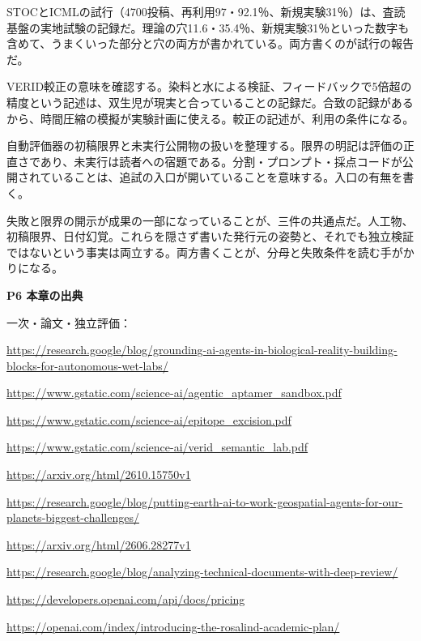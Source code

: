 \documentclass[lualatex,a4paper,10pt]{jlreq}
\begin{document}
STOCとICMLの試行（4700投稿、再利用97・92.1％、新規実験31％）は、査読基盤の実地試験の記録だ。理論の穴11.6・35.4％、新規実験31％といった数字も含めて、うまくいった部分と穴の両方が書かれている。両方書くのが試行の報告だ。
\cite{B49,B50}


VERID較正の意味を確認する。染料と水による検証、フィードバックで5倍超の精度という記述は、双生児が現実と合っていることの記録だ。合致の記録があるから、時間圧縮の模擬が実験計画に使える。較正の記述が、利用の条件になる。
\cite{B43,B44,B45,B46}


自動評価器の初稿限界と未実行公開物の扱いを整理する。限界の明記は評価の正直さであり、未実行は読者への宿題である。分割・プロンプト・採点コードが公開されていることは、追試の入口が開いていることを意味する。入口の有無を書く。
\cite{B47,B48}


失敗と限界の開示が成果の一部になっていることが、三件の共通点だ。人工物、初稿限界、日付幻覚。これらを隠さず書いた発行元の姿勢と、それでも独立検証ではないという事実は両立する。両方書くことが、分母と失敗条件を読む手がかりになる。
\cite{B49,B47,B50,B43,B48,B44,B45,B46}


\begin{tcolorbox}[colback=white,colframe=SurveyRule,arc=1mm,boxrule=0.4pt,left=2mm,right=2mm]
\textbf{P6 本章の出典}\par\footnotesize
一次・論文・独立評価：\par
[B43] \url{https://research.google/blog/grounding-ai-agents-in-biological-reality-building-blocks-for-autonomous-wet-labs/}\par
[B44] \url{https://www.gstatic.com/science-ai/agentic_aptamer_sandbox.pdf}\par
[B45] \url{https://www.gstatic.com/science-ai/epitope_excision.pdf}\par
[B46] \url{https://www.gstatic.com/science-ai/verid_semantic_lab.pdf}\par
[B47] \url{https://arxiv.org/html/2610.15750v1}\par
[B48] \url{https://research.google/blog/putting-earth-ai-to-work-geospatial-agents-for-our-planets-biggest-challenges/}\par
[B49] \url{https://arxiv.org/html/2606.28277v1}\par
[B50] \url{https://research.google/blog/analyzing-technical-documents-with-deep-review/}\par
[B51] \url{https://developers.openai.com/api/docs/pricing}\par
[B52] \url{https://openai.com/index/introducing-the-rosalind-academic-plan/}\par
\end{tcolorbox}
\end{document}
